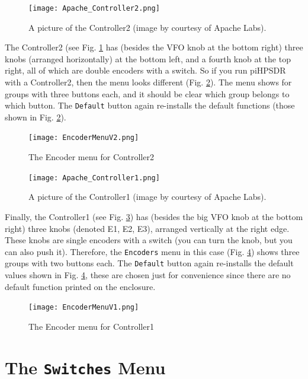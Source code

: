 \documentclass[12pt]{book}
\def\rett#1{\texttt{\color{red}#1}}
\def\bltt#1{\texttt{\color{blue}#1}}
\def\pH{pi\-HPSDR\xspace}
\begin{document}
\begin{figure}[ht!]
\center
\texttt{[image: Apache\_Controller2.png]}
\caption{A picture of the Controller2 (image by courtesy of Apache Labs).}
\label{fig:Apache_Controller2}
\end{figure}

The Controller2 (see Fig. \ref{fig:Apache_Controller2}
has (besides the VFO knob at the bottom right) three knobs (arranged horizontally) at the bottom left,
and a fourth knob at the top right, all of which are double encoders with a switch.
So if you run \pH with a Controller2, then the menu looks different (Fig. \ref{fig:EncoderMenuV2}).
The menu shows
for groups with three buttons each, and it should be clear which group belongs to which button. The
\rett{Default} button again re-installs the default functions (those shown in Fig. \ref{fig:EncoderMenuV2}).

\begin{figure}[ht!]
\center
\texttt{[image: EncoderMenuV2.png]}
\caption{The Encoder menu for Controller2}
\label{fig:EncoderMenuV2}
\end{figure}

\begin{figure}[ht!]
\center
\texttt{[image: Apache\_Controller1.png]}
\caption{A picture of the Controller1 (image by courtesy of Apache Labs).}
\label{fig:Apache_Controller1}
\end{figure}


Finally, the Controller1 (see Fig. \ref{fig:Apache_Controller1})
has (besides the big VFO knob at the bottom right)
three knobs (denoted E1, E2, E3), arranged vertically at the right edge. These knobs
are single encoders with a switch (you can turn the knob, but you can also push it). Therefore,
the \bltt{Encoders} menu in this case (Fig. \ref{fig:EncoderMenuV1}) shows three groups with
two buttons each. The \rett{Default} button again re-installs the default values shown in
Fig. \ref{fig:EncoderMenuV1}, these are chosen just for convenience since there are no default
function printed on the enclosure.

\begin{figure}[ht!]
\center
\texttt{[image: EncoderMenuV1.png]}
\caption{The Encoder menu for Controller1}
\label{fig:EncoderMenuV1}
\end{figure}

\clearpage
\section{The \texttt{Switches} Menu}
\end{document}
